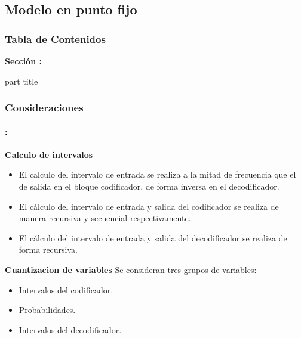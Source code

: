 
\subsection{Modelo en punto fijo}
\begin{frame}
  \frametitle{\textbf{Tabla de Contenidos}}
  \begin{center}
    {\vspace{-1.5cm}\Large \textbf{Sección \thesection: \secname }\vspace{0.5cm}}
    \begin{beamercolorbox}[
      sep=8pt,center]{part title}
      \textbf{\subsecname}
    \end{beamercolorbox}
  \end{center}
\end{frame}

\begin{frame}
  \frametitle{\textbf{Consideraciones}}
   \framesubtitle{\secname : \subsecname}

    \begin{block}{\centering \textbf{Calculo de intervalos}}
    \begin{itemize}\small
    \item El calculo del intervalo de entrada se realiza a la mitad de frecuencia que el de salida en el bloque codificador, de forma inversa en el decodificador.
     \item El cálculo del intervalo de entrada y salida del codificador se realiza de manera recursiva y secuencial respectivamente.
    \item El cálculo del intervalo de entrada y salida del decodificador se realiza de forma recursiva.
    \end{itemize}
    \end{block}
    \vspace{-0.2cm}

    \begin{block}{\centering \textbf{Cuantizacion de variables}}
    Se consideran tres grupos de variables:
    \begin{itemize}\small
    \item Intervalos del codificador.
    \item Probabilidades.
    \item Intervalos del decodificador.
    \end{itemize}
    \end{block}
\end{frame}

